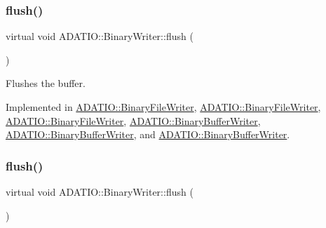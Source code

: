\mbox{\label{classADATIO_1_1BinaryWriter_a1d335eeed64094b8641f3ebf731c981e}} 
\subsubsection{\texorpdfstring{flush()}{flush()}\hspace{0.1cm}{\footnotesize\ttfamily [2/3]}}
{\footnotesize\ttfamily virtual void A\+D\+A\+T\+I\+O\+::\+Binary\+Writer\+::flush (\begin{DoxyParamCaption}{ }\end{DoxyParamCaption})\hspace{0.3cm}{\ttfamily [pure virtual]}}



Flushes the buffer. 



Implemented in \mbox{\hyperlink{classADATIO_1_1BinaryFileWriter_ad914b901c6386a2ad7b2c8cf9bddfa9b}{A\+D\+A\+T\+I\+O\+::\+Binary\+File\+Writer}}, \mbox{\hyperlink{classADATIO_1_1BinaryFileWriter_ad914b901c6386a2ad7b2c8cf9bddfa9b}{A\+D\+A\+T\+I\+O\+::\+Binary\+File\+Writer}}, \mbox{\hyperlink{classADATIO_1_1BinaryFileWriter_ad914b901c6386a2ad7b2c8cf9bddfa9b}{A\+D\+A\+T\+I\+O\+::\+Binary\+File\+Writer}}, \mbox{\hyperlink{classADATIO_1_1BinaryBufferWriter_accc3319508a804b054d21b6bddeef85d}{A\+D\+A\+T\+I\+O\+::\+Binary\+Buffer\+Writer}}, \mbox{\hyperlink{classADATIO_1_1BinaryBufferWriter_accc3319508a804b054d21b6bddeef85d}{A\+D\+A\+T\+I\+O\+::\+Binary\+Buffer\+Writer}}, and \mbox{\hyperlink{classADATIO_1_1BinaryBufferWriter_accc3319508a804b054d21b6bddeef85d}{A\+D\+A\+T\+I\+O\+::\+Binary\+Buffer\+Writer}}.

\mbox{\label{classADATIO_1_1BinaryWriter_a1d335eeed64094b8641f3ebf731c981e}} 
\subsubsection{\texorpdfstring{flush()}{flush()}\hspace{0.1cm}{\footnotesize\ttfamily [3/3]}}
{\footnotesize\ttfamily virtual void A\+D\+A\+T\+I\+O\+::\+Binary\+Writer\+::flush (\begin{DoxyParamCaption}{ }\end{DoxyParamCaption})\hspace{0.3cm}{\ttfamily [pure virtual]}}



